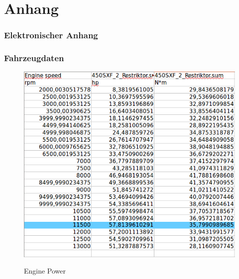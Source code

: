 

\renewcommand{\thefigure}{A\arabic{figure}} 
\chapter{Anhang}

\subsection*{Elektronischer Anhang }

\subsection*{Fahrzeugdaten}
\begin{figure}[hb!]
	\caption{Engine Power}
	\includegraphics[width=350pt]{Abbildungen/Engine_power.png}
	\label{fig:enginePower}
\end{figure}


